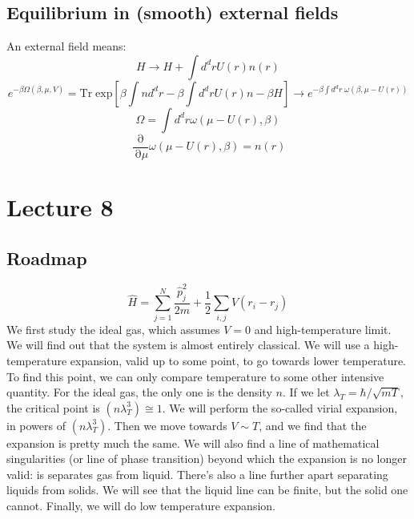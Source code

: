 \documentclass[12 pt]{article}
\DeclareMathOperator {\p} {\partial}
\begin{document}
\subsection*{Equilibrium in (smooth) external fields}
An external field means:
\[    H \to H + \int d^d r U(r) n(r)     \]
\[     e^{-\beta \Omega(\beta, \mu, V)} = \text{Tr} \; \text{exp}\left[\beta \int n d^d r - \beta \int d^d r U(r) n - \beta H \right]  \to e^{- \beta \int d^d r\; \omega(\beta, \mu - U(r))}   \]
\[   \Omega = \int d^d r \omega(\mu - U(r), \beta)  \]
\[       \frac{\p}{\p \mu} \omega(\mu - U(r) , \beta) = n(r)     \]


\section*{Lecture 8}

\subsection*{Roadmap}
\[    \hat H = \sum_{j=1}^N \frac{\hat p_j^2}{2m} + \frac{1}{2} \sum_{i,j} V(r_i - r_j)     \]
We first study the ideal gas, which assumes $V = 0$ and high-temperature limit. We will find out that the system is almost entirely classical. We will use a high-temperature expansion, valid up to some point, to go towards lower temperature. To find this point, we can only compare temperature to some other intensive quantity. For the ideal gas, the only one is the density $n$. If we let $\lambda_T = \hbar/\sqrt{mT}$, the critical point is $(n\lambda_T^3) \cong 1$. We will perform the so-called virial expansion, in powers of $(n\lambda_T^3)$. Then we move towards $V \sim T$, and we find that the expansion is pretty much the same. We will also find a line of mathematical singularities (or line of phase transition) beyond which the expansion is no longer valid: is separates gas from liquid. There's also a line further apart separating liquids from solids. We will see that the liquid line can be finite, but the solid one cannot. Finally, we will do low temperature expansion.
\end{document}
